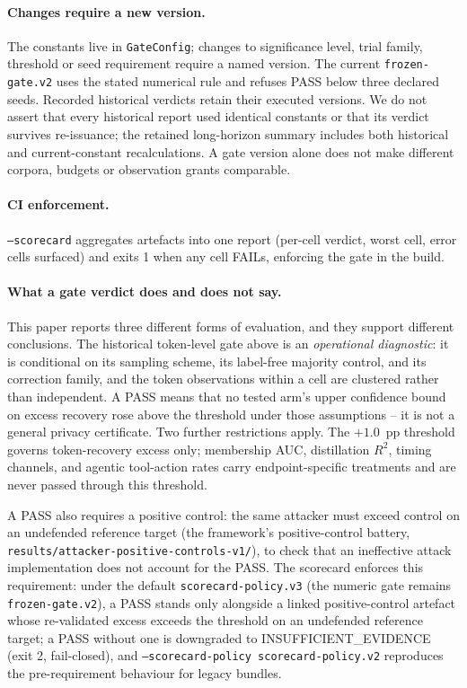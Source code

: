 \documentclass[11pt]{article}
\newcommand{\pp}{pp}
\begin{document}
\paragraph{Changes require a new version.}
The constants live in \texttt{GateConfig}; changes to significance level, trial family, threshold or seed requirement require a named version. The current \texttt{frozen-gate.v2} uses the stated numerical rule and refuses PASS below three declared seeds. Recorded historical verdicts retain their executed versions. We do not assert that every historical report used identical constants or that its verdict survives re-issuance; the retained long-horizon summary includes both historical and current-constant recalculations. A gate version alone does not make different corpora, budgets or observation grants comparable.

\paragraph{CI enforcement.}
\texttt{--scorecard} aggregates artefacts into one report (per-cell
verdict, worst cell, error cells surfaced) and exits 1 when any cell
FAILs, enforcing the gate in the build.

\paragraph{What a gate verdict does and does not say.}
This paper reports three different forms of evaluation, and they support
different conclusions. The historical token-level gate above is an
\emph{operational diagnostic}: it is conditional on its sampling scheme,
its label-free majority control, and its correction family, and the token
observations within a cell are clustered rather than independent. A PASS
means that no tested arm's upper confidence bound on excess recovery rose
above the threshold under those assumptions -- it is not a general
privacy certificate. Two further restrictions apply. The $+1.0$~\pp{}
threshold governs token-recovery excess only; membership AUC,
distillation $R^2$, timing channels, and agentic tool-action rates carry
endpoint-specific treatments and are never passed through this
threshold.

A PASS also requires a positive control:
the same attacker must exceed control on an undefended reference target
(the framework's positive-control battery,
\nolinkurl{results/attacker-positive-controls-v1/}), to check that an ineffective attack implementation does not account for
the PASS. The scorecard
enforces this requirement: under the default \texttt{scorecard-policy.v3} (the
numeric gate remains \texttt{frozen-gate.v2}), a PASS stands only
alongside a linked positive-control artefact whose re-validated excess
exceeds the threshold on an undefended reference target; a PASS without
one is downgraded to INSUFFICIENT\_EVIDENCE (exit 2, fail-closed), and
\texttt{--scorecard-policy scorecard-policy.v2} reproduces the
pre-requirement behaviour for legacy bundles.
\end{document}
